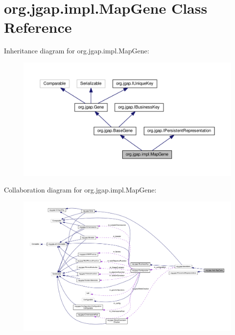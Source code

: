 \hypertarget{classorg_1_1jgap_1_1impl_1_1_map_gene}{\section{org.\-jgap.\-impl.\-Map\-Gene Class Reference}
\label{classorg_1_1jgap_1_1impl_1_1_map_gene}
}


Inheritance diagram for org.\-jgap.\-impl.\-Map\-Gene\-:
\nopagebreak
\begin{figure}[H]
\begin{center}
\leavevmode
\includegraphics[width=350pt]{classorg_1_1jgap_1_1impl_1_1_map_gene__inherit__graph}
\end{center}
\end{figure}


Collaboration diagram for org.\-jgap.\-impl.\-Map\-Gene\-:
\nopagebreak
\begin{figure}[H]
\begin{center}
\leavevmode
\includegraphics[width=350pt]{classorg_1_1jgap_1_1impl_1_1_map_gene__coll__graph}
\end{center}
\end{figure}
